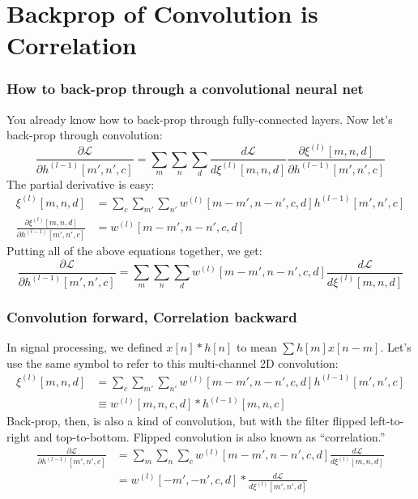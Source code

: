 \documentclass{beamer}
\begin{document}
\section[Backprop]{Backprop of Convolution is Correlation}
\setcounter{subsection}{1}

\begin{frame}
  \frametitle{How to back-prop through a convolutional neural net}

  You already know how to back-prop through fully-connected layers.  Now let's
  back-prop through convolution:
  \begin{displaymath}
    \frac{\partial{\mathcal L}}{\partial h^{(l-1)}[m',n',c]} =
    \sum_{m}\sum_n\sum_d\frac{d{\mathcal L}}{d\xi^{(l)}[m,n,d]}
    \frac{\partial\xi^{(l)}[m,n,d]}{\partial h^{(l-1)}[m',n',c]}
  \end{displaymath}
  The partial derivative is easy:
  \begin{align*}
    \xi^{(l)}[m,n,d] &= \sum_c\sum_{m'}\sum_{n'} w^{(l)}[m-m',n-n',c,d]h^{(l-1)}[m',n',c]\\
    \frac{\partial\xi^{(l)}[m,n,d]}{\partial h^{(l-1)}[m',n',c]} &= w^{(l)}[m-m',n-n',c,d]
  \end{align*}
  Putting all of the above equations together, we get:
  \begin{displaymath}
    \frac{\partial{\mathcal L}}{\partial h^{(l-1)}[m',n',c]} =
    \sum_{m}\sum_n\sum_d w^{(l)}[m-m',n-n',c,d]\frac{d{\mathcal L}}{d\xi^{(l)}[m,n,d]}
  \end{displaymath}
\end{frame}

\begin{frame}
  \frametitle{Convolution forward, Correlation backward}

  In signal processing, we defined $x[n]\ast h[n]$ to mean $\sum
  h[m]x[n-m]$.  Let's use the same symbol to refer to this
  multi-channel 2D convolution:
  \begin{align*}
    \xi^{(l)}[m,n,d] &= \sum_c\sum_{m'}\sum_{n'} w^{(l)}[m-m',n-n',c,d]h^{(l-1)}[m',n',c]\\
    &\equiv w^{(l)}[m,n,c,d] \ast h^{(l-1)}[m,n,c]
  \end{align*}
  Back-prop, then, is also a kind of convolution, but with the filter
  flipped left-to-right and top-to-bottom.  Flipped convolution is also
  known as ``correlation.''
  \begin{align*}
    \frac{\partial{\mathcal L}}{\partial h^{(l-1)}[m',n',c]} &=
    \sum_{m}\sum_{n}\sum_c w^{(l)}[m-m',n-n',c,d]\frac{d{\mathcal L}}{d\xi^{(l)}[m,n,d]}\\
    &= w^{(l)}[-m',-n',c,d] \ast \frac{d{\mathcal L}}{d\xi^{(l)}[m',n',d]}\\
  \end{align*}
\end{frame}
\end{document}
